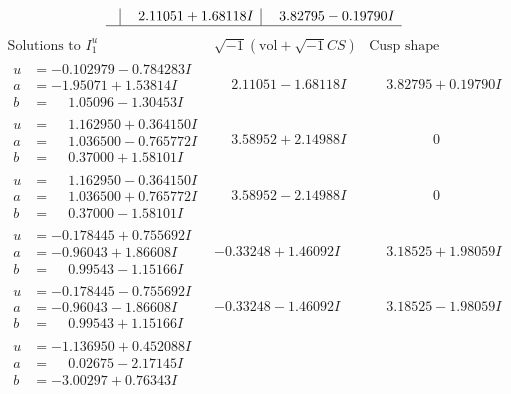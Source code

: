 \documentclass[1p]{elsarticle_modified}
\theoremstyle{definition}
\newcommand{\I}{\sqrt{-1}}
\begin{document}
$$\begin{array}{c|c|c}
 & \phantom{-}2.11051 + 1.68118 I & \phantom{-}3.82795 - 0.19790 I\\
 \hline 
 \end{array}$$\newpage$$\begin{array}{c|c|c}  
\text{Solutions to }I^u_{1}& \I (\text{vol} + \sqrt{-1}CS) & \text{Cusp shape}\\
 \hline 
\begin{aligned}
u &= -0.102979 - 0.784283 I \\
a &= -1.95071 + 1.53814 I \\
b &= \phantom{-}1.05096 - 1.30453 I\end{aligned}
 & \phantom{-}2.11051 - 1.68118 I & \phantom{-}3.82795 + 0.19790 I \\ \hline\begin{aligned}
u &= \phantom{-}1.162950 + 0.364150 I \\
a &= \phantom{-}1.036500 - 0.765772 I \\
b &= \phantom{-}0.37000 + 1.58101 I\end{aligned}
 & \phantom{-}3.58952 + 2.14988 I & \phantom{-0.000000 } 0 \\ \hline\begin{aligned}
u &= \phantom{-}1.162950 - 0.364150 I \\
a &= \phantom{-}1.036500 + 0.765772 I \\
b &= \phantom{-}0.37000 - 1.58101 I\end{aligned}
 & \phantom{-}3.58952 - 2.14988 I & \phantom{-0.000000 } 0 \\ \hline\begin{aligned}
u &= -0.178445 + 0.755692 I \\
a &= -0.96043 + 1.86608 I \\
b &= \phantom{-}0.99543 - 1.15166 I\end{aligned}
 & -0.33248 + 1.46092 I & \phantom{-}3.18525 + 1.98059 I \\ \hline\begin{aligned}
u &= -0.178445 - 0.755692 I \\
a &= -0.96043 - 1.86608 I \\
b &= \phantom{-}0.99543 + 1.15166 I\end{aligned}
 & -0.33248 - 1.46092 I & \phantom{-}3.18525 - 1.98059 I \\ \hline\begin{aligned}
u &= -1.136950 + 0.452088 I \\
a &= \phantom{-}0.02675 - 2.17145 I \\
b &= -3.00297 + 0.76343 I\end{aligned}

\end{array}$$
\end{document}
